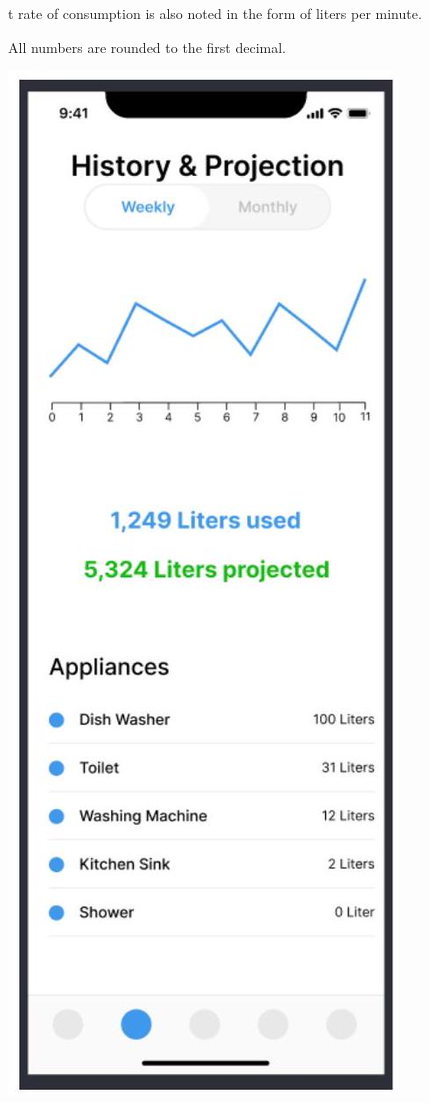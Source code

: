 \documentclass[10pt]{article}
\begin{document}
\begin{enumerate}
t rate of consumption is also noted in the form of liters per minute.

  All numbers are rounded to the first decimal.

  \includegraphics[max width=\textwidth]{2022_11_16_e80008f3d60227bff292g-6(2)}


\end{enumerate}
\end{document}
